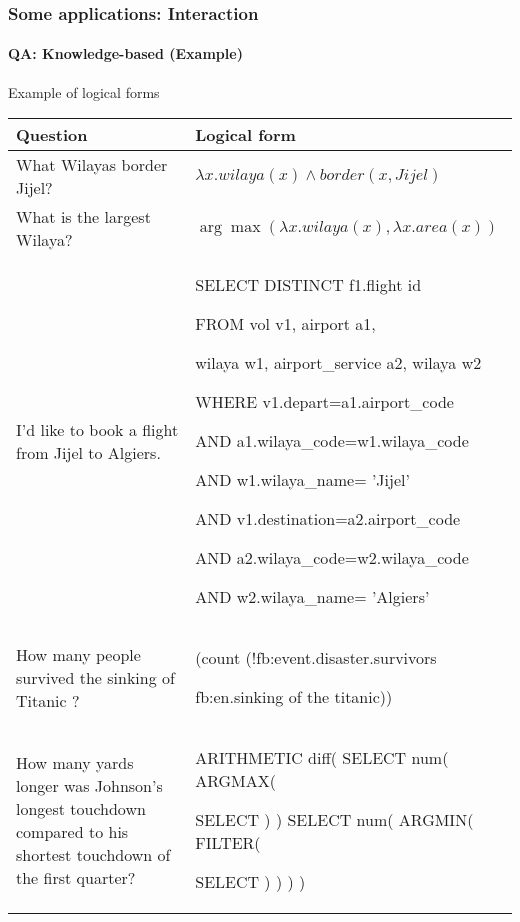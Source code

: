 \documentclass[xcolor=table]{beamer}
\begin{document}
\begin{frame}
	\frametitle{Some applications: Interaction}
	\framesubtitle{QA: Knowledge-based (Example)}
	
	\begin{exampleblock}{Example of logical forms \cite{2020-jurafsky-martin}}
		\centering\tiny\bfseries
		\begin{tabular}{p{}p{}}
			\hline\hline
			Question & Logical form \\
			\hline
			What Wilayas border Jijel? 
			& $\lambda x.wilaya(x) \wedge border(x, Jijel)$ \\
			
			What is the largest Wilaya? 
			& $\arg\max(\lambda x.wilaya(x), \lambda x.area(x))$ \\
			
			I'd like to book a flight from Jijel to Algiers. 
			& {\color{blue}SELECT DISTINCT} f1.flight id
			
			{\color{blue}FROM} vol v1, airport  a1,
			
			wilaya w1, airport\_service a2, wilaya w2
			
			{\color{blue}WHERE} v1.depart=a1.airport\_code
			
			{\color{blue}AND} a1.wilaya\_code=w1.wilaya\_code
			
			{\color{blue}AND} w1.wilaya\_name= '{\color{red}Jijel}'
			
			{\color{blue}AND} v1.destination=a2.airport\_code
			
			{\color{blue}AND} a2.wilaya\_code=w2.wilaya\_code
			
			{\color{blue}AND} w2.wilaya\_name= '{\color{red}Algiers}' \\
			
			
			How many people survived the sinking of Titanic ? 
			& (count (!fb:event.disaster.survivors
			
			fb:en.sinking of the titanic))\\
			
			How many yards longer was Johnson's longest touchdown compared to his shortest touchdown of the first quarter?
			& 
			ARITHMETIC diff( SELECT num( ARGMAX(
			
			SELECT ) ) SELECT num( ARGMIN( FILTER(
			
			SELECT ) ) ) )\\
			\hline\hline
		\end{tabular}
	\end{exampleblock}
	
	
\end{frame}
\end{document}

